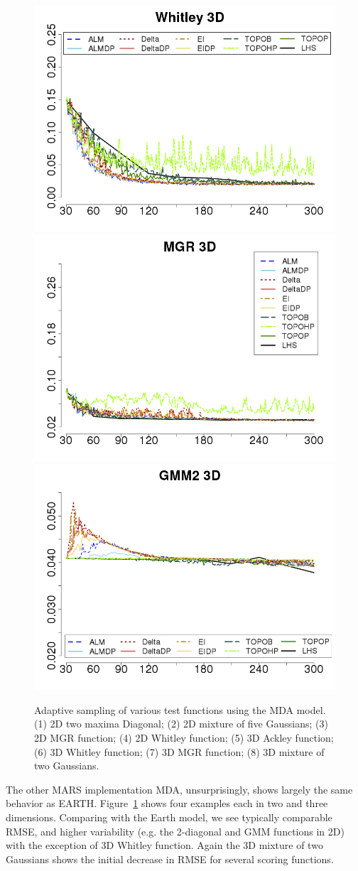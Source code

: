 \begin{figure}[htbp]
\begin{center}
  \includegraphics[width=0.24\linewidth]{figs/chap5/mda_Whitley_td=30}
  \includegraphics[width=0.24\linewidth]{figs/chap5/mda_MGR_td=30}
  \includegraphics[width=0.24\linewidth]{figs/chap5/mda_GMM2_3D_td=30}
\caption{Adaptive sampling of various test functions using the MDA model.
(1) 2D two maxima Diagonal;
(2) 2D mixture of five Gaussians;
(3) 2D MGR function;
(4) 2D Whitley function;
(5) 3D Ackley function;
(6) 3D Whitley function;
(7) 3D MGR function;
(8) 3D mixture of two Gaussians.}
\label{fig:mda}
\end{center}
\end{figure}

The other MARS implementation MDA, unsurprisingly, shows largely the same behavior as EARTH.
%
Figure~\ref{fig:mda} shows four examples each in two and three dimensions.
%
Comparing with the Earth model, we see typically comparable RMSE, and higher variability (e.g. the 2-diagonal and GMM functions in 2D) with the exception of 3D Whitley function.
%
Again the 3D mixture of two Gaussians shows the initial decrease in RMSE for several scoring functions.

